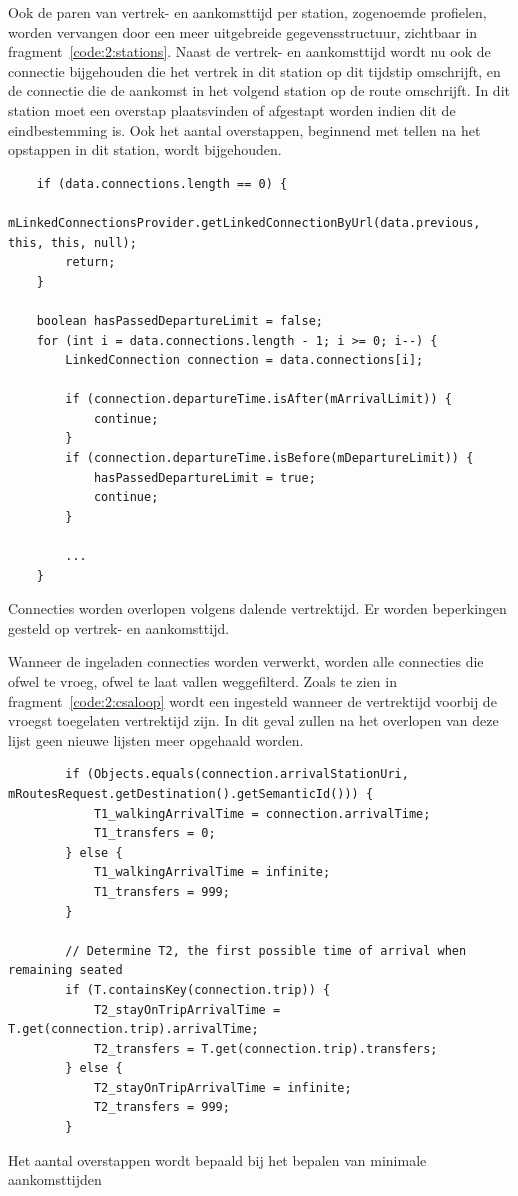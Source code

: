 Ook de paren van vertrek- en aankomsttijd per station, zogenoemde profielen, worden vervangen door een meer uitgebreide gegevensstructuur, zichtbaar in fragment~\ref{code:2:stations}. Naast de vertrek- en aankomsttijd wordt nu ook de connectie bijgehouden die het vertrek in dit station op dit tijdstip omschrijft, en de connectie die de aankomst in het volgend station op de route omschrijft. In dit station moet een overstap plaatsvinden of afgestapt worden indien dit de eindbestemming is. Ook het aantal overstappen, beginnend met tellen na het opstappen in dit station, wordt bijgehouden.

\begin{listing}[!h]
\begin{verbatim}
	if (data.connections.length == 0) {
		mLinkedConnectionsProvider.getLinkedConnectionByUrl(data.previous, this, this, null);
		return;
	}
	
	boolean hasPassedDepartureLimit = false;
	for (int i = data.connections.length - 1; i >= 0; i--) {
		LinkedConnection connection = data.connections[i];
		
		if (connection.departureTime.isAfter(mArrivalLimit)) {
			continue;
		}
		if (connection.departureTime.isBefore(mDepartureLimit)) {
			hasPassedDepartureLimit = true;
			continue;
		}
		
		...
	}
	\end{verbatim}
			\caption[CSA: Overlopen van connecties]{Connecties worden overlopen volgens dalende vertrektijd. Er worden beperkingen gesteld op vertrek- en aankomsttijd.}
	\label{code:2:csaloop}
\end{listing}

Wanneer de ingeladen connecties worden verwerkt, worden alle connecties die ofwel te vroeg, ofwel te laat vallen weggefilterd. Zoals te zien in fragment~\ref{code:2:csaloop} wordt een  ingesteld wanneer de vertrektijd voorbij de vroegst toegelaten vertrektijd zijn. In dit geval zullen na het overlopen van deze lijst geen nieuwe lijsten meer opgehaald worden. 

\begin{listing}[htb]
	\begin{verbatim}
	 	if (Objects.equals(connection.arrivalStationUri, mRoutesRequest.getDestination().getSemanticId())) {
			T1_walkingArrivalTime = connection.arrivalTime;
			T1_transfers = 0;
		} else {
			T1_walkingArrivalTime = infinite;
			T1_transfers = 999;
		}

		// Determine T2, the first possible time of arrival when remaining seated
		if (T.containsKey(connection.trip)) {
			T2_stayOnTripArrivalTime = T.get(connection.trip).arrivalTime;
			T2_transfers = T.get(connection.trip).transfers;
		} else {
			T2_stayOnTripArrivalTime = infinite;
			T2_transfers = 999;
		}	
		\end{verbatim}
					\caption[CSA: Bepalen van aankomsttijden]{Het aantal overstappen wordt bepaald bij het bepalen van minimale aankomsttijden}
		\label{code:2:csaT1T2}
\end{listing}

